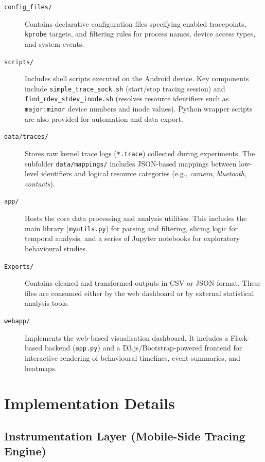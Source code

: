 \documentclass[a4paper,12pt]{report}
\begin{document}
\begin{description}
  \item[\texttt{config\_files/}] Contains declarative configuration files specifying enabled tracepoints, \texttt{kprobe} targets, and filtering rules for process names, device access types, and system events.

  \item[\texttt{scripts/}] Includes shell scripts executed on the Android device. Key components include \texttt{simple\_trace\_sock.sh} (start/stop tracing session) and \texttt{find\_rdev\_stdev\_inode.sh} (resolves resource identifiers such as \texttt{major:minor} device numbers and inode values). Python wrapper scripts are also provided for automation and data export.

  \item[\texttt{data/traces/}] Stores raw kernel trace logs (\texttt{*.trace}) collected during experiments. The subfolder \texttt{data/mappings/} includes JSON-based mappings between low-level identifiers and logical resource categories (e.g., \emph{camera}, \emph{bluetooth}, \emph{contacts}).

  \item[\texttt{app/}] Hosts the core data processing and analysis utilities. This includes the main library (\texttt{myutils.py}) for parsing and filtering, slicing logic for temporal analysis, and a series of Jupyter notebooks for exploratory behavioural studies.

  \item[\texttt{Exports/}] Contains cleaned and transformed outputs in CSV or JSON format. These files are consumed either by the web dashboard or by external statistical analysis tools.

  \item[\texttt{webapp/}] Implements the web-based visualisation dashboard. It includes a Flask-based backend (\texttt{app.py}) and a D3.js/Bootstrap-powered frontend for interactive rendering of behavioural timelines, event summaries, and heatmaps.
\end{description}


\section{Implementation Details}

\subsection{Instrumentation Layer (Mobile-Side Tracing Engine)}
\end{document}

